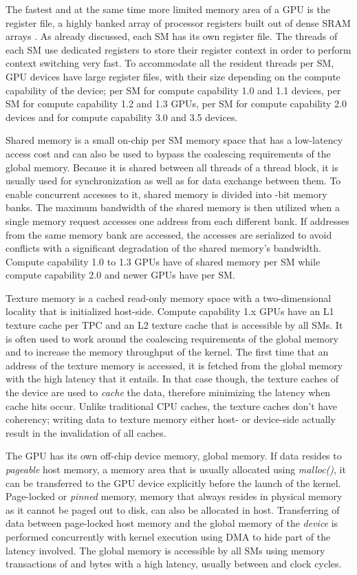 \documentclass{ws-ijait}
\begin{document}
The fastest and at the same time more limited memory area of a GPU is the register file, a highly banked array of processor registers built out of dense SRAM arrays \cite{Gebhart2012}. As already discussed, each SM has its own register file. The threads of each SM use dedicated registers to store their register context in order to perform context switching very fast. To accommodate all the resident threads per SM, GPU devices have large register files, with their size depending on the compute capability of the device;  per SM for compute capability 1.0 and 1.1 devices,  per SM for compute capability 1.2 and 1.3 GPUs,  per SM for compute capability 2.0 devices and  for compute capability 3.0 and 3.5 devices.

Shared memory is a small on-chip per SM memory space that has a low-latency access cost and can also be used to bypass the coalescing requirements of the global memory. Because it is shared between all threads of a thread block, it is usually used for synchronization as well as for data exchange between them. To enable concurrent accesses to it, shared memory is divided into -bit memory banks. The maximum bandwidth of the shared memory is then utilized when a single memory request accesses one address from each different bank. If addresses from the same memory bank are accessed, the accesses are serialized to avoid conflicts with a significant degradation of the shared memory's bandwidth. Compute capability 1.0 to 1.3 GPUs have  of shared memory per SM while compute capability 2.0 and newer GPUs have  per SM.

Texture memory is a cached read-only memory space with a two-dimensional locality that is initialized host-side. Compute capability 1.x GPUs have an L1 texture cache per TPC and an L2 texture cache that is accessible by all SMs. It is often used to work around the coalescing requirements of the global memory and to increase the memory throughput of the kernel. The first time that an address of the texture memory is accessed, it is fetched from the global memory with the high latency that it entails. In that case though, the texture caches of the device are used to \textit{cache} the data, therefore minimizing the latency when cache hits occur. Unlike traditional CPU caches, the texture caches don't have coherency; writing data to texture memory either host- or device-side actually result in the invalidation of all caches.

The GPU has its own off-chip device memory, global memory. If data resides to \textit{pageable} host memory, a memory area that is usually allocated using \textit{malloc()}, it can be transferred to the GPU device explicitly before the launch of the kernel. Page-locked or \textit{pinned} memory, memory that always resides in physical memory as it cannot be paged out to disk, can also be allocated in host. Transferring of data between page-locked host memory and the global memory of the \textit{device} is performed concurrently with kernel execution using DMA to hide part of the latency involved. The global memory is accessible by all SMs using memory transactions of  and  bytes with a high latency, usually between  and  clock cycles.
\end{document}
